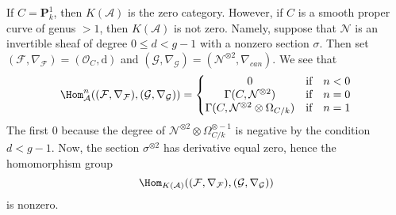\medskip\noindent
If $C = \mathbf{P}^1_k$, then $K(\mathcal{A})$ is the zero category.
However, if $C$ is a smooth proper curve of genus $> 1$, then
$K(\mathcal{A})$ is not zero. Namely, suppose that $\mathcal{N}$
is an invertible sheaf
of degree $0 \leq d < g - 1$ with a nonzero section $\sigma$.
Then set
$(\mathcal{F}, \nabla_\mathcal{F}) = (\mathcal{O}_C, \text{d})$
and
$(\mathcal{G}, \nabla_\mathcal{G}) = (\mathcal{N}^{\otimes 2}, \nabla_{can})$.
We see that
$$
\Hom_\mathcal{A}^n((\mathcal{F}, \nabla_\mathcal{F}),
(\mathcal{G}, \nabla_\mathcal{G})) =
\left\{
\begin{matrix}
0 & \text{if} & n < 0 \\
\Gamma(C, \mathcal{N}^{\otimes 2}) & \text{if} & n = 0 \\
\Gamma(C, \mathcal{N}^{\otimes 2} \otimes \Omega_{C/k}) & \text{if} & n = 1
\end{matrix}
\right.
$$
The first $0$ because the degree of
$\mathcal{N}^{\otimes 2} \otimes \Omega_{C/k}^{\otimes -1}$
is negative by the condition $d < g - 1$. Now, the section
$\sigma^{\otimes 2}$ has derivative equal zero, hence the homomorphism
group
$$
\Hom_{K(\mathcal{A})}((\mathcal{F}, \nabla_\mathcal{F}),
(\mathcal{G}, \nabla_\mathcal{G}))
$$
is nonzero.







